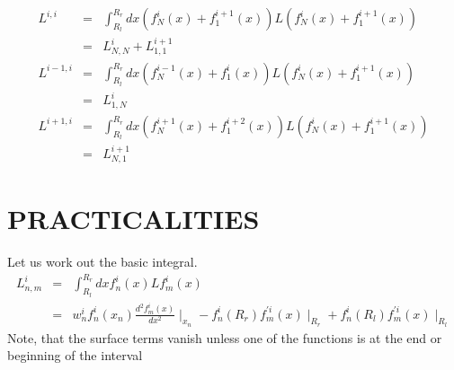 \documentclass[preprint,aps]{revtex4}
\begin{document}
\begin{eqnarray}
    L^{i,i} &=& \int_{R_{l}}^{R_{r}} dx ( f^{i}_{N}(x) + f^{i+1}_{1}(x) ) L 
                      ( f^{i}_{N}(x) + f^{i+1}_{1}(x) ) \\ \nonumber
            &=& L^{i}_{N,N} + L^{i+1}_{1,1} \\ \nonumber
    L^{i-1,i} &=& \int_{R_{l}}^{R_{r}} dx ( f^{i-1}_{N}(x) + f^{i}_{1}(x) ) L 
                      ( f^{i}_{N}(x) + f^{i+1}_{1}(x) ) \\ \nonumber
            &=& L^{i}_{1,N} \\ \nonumber
    L^{i+1,i} &=& \int_{R_{l}}^{R_{r}} dx ( f^{i+1}_{N}(x) + f^{i+2}_{1}(x) )
                    L ( f^{i}_{N}(x) + f^{i+1}_{1}(x) ) \\ \nonumber
            &=& L^{i+1}_{N,1} 
\end{eqnarray}

\section{PRACTICALITIES}
Let us work out the basic integral.
\begin{eqnarray}
   L^{i}_{n,m} &=& \int_{ R_{l} } ^ { R_{r} } dx f^{i}_{n}(x) L f^{i}_{m}(x) 
                                   \\ \nonumber
                &=& w^{i}_{n} f^{i}_{n}(x_{n}) \frac{d^2 f^{i}_{m}(x)}{dx^2}
                                                \mid_{ x_{n} }  
                  - f^{i}_{n} ( R_{r} ) f^{\prime i}_{m}(x) \mid_{ R_{r} }
                  + f^{i}_{n} ( R_{l} ) f^{\prime i}_{m}(x) \mid_{ R_{l} }  
\end{eqnarray}
Note, that the surface terms vanish unless one of the functions is at the end
or beginning of the interval
\end{document}
